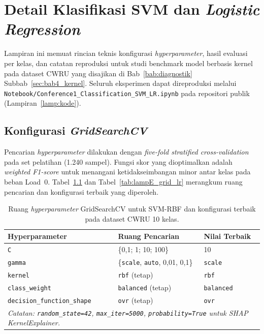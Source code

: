 
\chapter{Detail Klasifikasi SVM dan \emph{Logistic Regression}}
\label{lamp:svm_lr}

Lampiran ini memuat rincian teknis konfigurasi \emph{hyperparameter},
hasil evaluasi per kelas, dan catatan reproduksi untuk studi
benchmark model berbasis kernel pada dataset CWRU yang disajikan
di Bab~\ref{bab:diagnostik} Subbab~\ref{sec:bab4_kernel}. Seluruh eksperimen
dapat direproduksi melalui
\texttt{Notebook/Conference1\_Classification\_SVM\_LR.ipynb}
pada repositori publik (Lampiran~\ref{lamp:kode}).

\section{Konfigurasi \emph{GridSearchCV}}
\label{lamp:svmlr_grid}

Pencarian \emph{hyperparameter} dilakukan dengan \emph{five-fold
stratified cross-validation} pada set pelatihan (1.240 sampel).
Fungsi skor yang dioptimalkan adalah \emph{weighted F1-score} untuk
menangani ketidakseimbangan minor antar kelas pada beban Load~0.
Tabel~\ref{tab:lampE_grid_svm} dan Tabel~\ref{tab:lampE_grid_lr}
merangkum ruang pencarian dan konfigurasi terbaik yang diperoleh.

\begin{table}[ht]
  \centering
  \caption{Ruang \emph{hyperparameter} GridSearchCV untuk SVM-RBF dan
           konfigurasi terbaik pada dataset CWRU 10 kelas.}
  \label{tab:lampE_grid_svm}
  \footnotesize
  \begin{tabularx}{\textwidth}{@{}l X X@{}}
    \toprule
    \textbf{Hyperparameter} & \textbf{Ruang Pencarian} & \textbf{Nilai Terbaik} \\
    \midrule
    \texttt{C}              & \{0,1; 1; 10; 100\}                     & 10 \\
    \texttt{gamma}          & \{\texttt{scale}, \texttt{auto}, 0,01, 0,1\} & \texttt{scale} \\
    \texttt{kernel}         & \texttt{rbf} (tetap)                    & \texttt{rbf} \\
    \texttt{class\_weight}  & \texttt{balanced} (tetap)               & \texttt{balanced} \\
    \texttt{decision\_function\_shape} & \texttt{ovr} (tetap) & \texttt{ovr} \\
    \midrule
    \multicolumn{3}{l}{\textit{Catatan: \texttt{random\_state=42}, \texttt{max\_iter=5000},
      \texttt{probability=True} untuk SHAP KernelExplainer.}} \\
    \bottomrule
  \end{tabularx}
\end{table}

